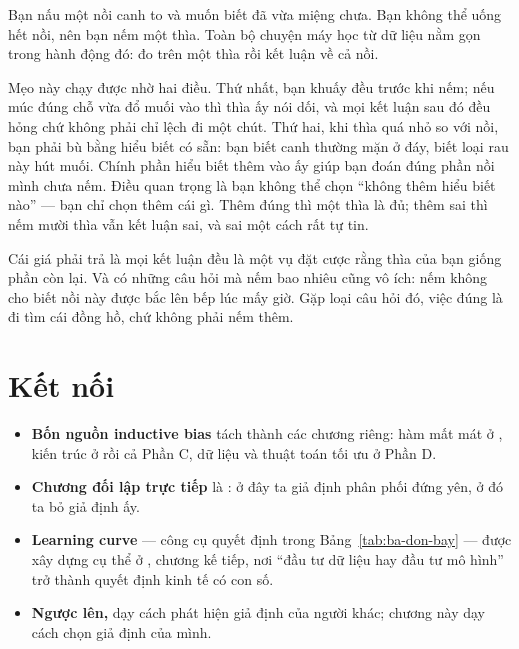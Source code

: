 \documentclass[../../deep_learning.tex]{subfiles}
\begin{document}
\begin{dongian}
Bạn nấu một nồi canh to và muốn biết đã vừa miệng chưa. Bạn không thể uống hết nồi, nên bạn nếm một thìa. Toàn bộ chuyện máy học từ dữ liệu nằm gọn trong hành động đó: đo trên một thìa rồi kết luận về cả nồi.

Mẹo này chạy được nhờ hai điều. Thứ nhất, bạn khuấy đều trước khi nếm; nếu múc đúng chỗ vừa đổ muối vào thì thìa ấy nói dối, và mọi kết luận sau đó đều hỏng chứ không phải chỉ lệch đi một chút. Thứ hai, khi thìa quá nhỏ so với nồi, bạn phải bù bằng hiểu biết có sẵn: bạn biết canh thường mặn ở đáy, biết loại rau này hút muối. Chính phần hiểu biết thêm vào ấy giúp bạn đoán đúng phần nồi mình chưa nếm. Điều quan trọng là bạn không thể chọn ``không thêm hiểu biết nào'' --- bạn chỉ chọn thêm cái gì. Thêm đúng thì một thìa là đủ; thêm sai thì nếm mười thìa vẫn kết luận sai, và sai một cách rất tự tin.

Cái giá phải trả là mọi kết luận đều là một vụ đặt cược rằng thìa của bạn giống phần còn lại. Và có những câu hỏi mà nếm bao nhiêu cũng vô ích: nếm không cho biết nồi này được bắc lên bếp lúc mấy giờ. Gặp loại câu hỏi đó, việc đúng là đi tìm cái đồng hồ, chứ không phải nếm thêm.

\end{dongian}

\section{Kết nối}

\begin{itemize}
\item \textbf{Bốn nguồn inductive bias} tách thành các chương riêng: hàm mất mát ở , kiến trúc ở  rồi cả Phần C, dữ liệu và thuật toán tối ưu ở Phần D.
\item \textbf{Chương đối lập trực tiếp} là : ở đây ta giả định phân phối đứng yên, ở đó ta bỏ giả định ấy.
\item \textbf{Learning curve} --- công cụ quyết định trong Bảng~\ref{tab:ba-don-bay} --- được xây dựng cụ thể ở , chương kế tiếp, nơi ``đầu tư dữ liệu hay đầu tư mô hình'' trở thành quyết định kinh tế có con số.
\item \textbf{Ngược lên,}  dạy cách phát hiện giả định của người khác; chương này dạy cách chọn giả định của mình.
\end{itemize}
\end{document}
